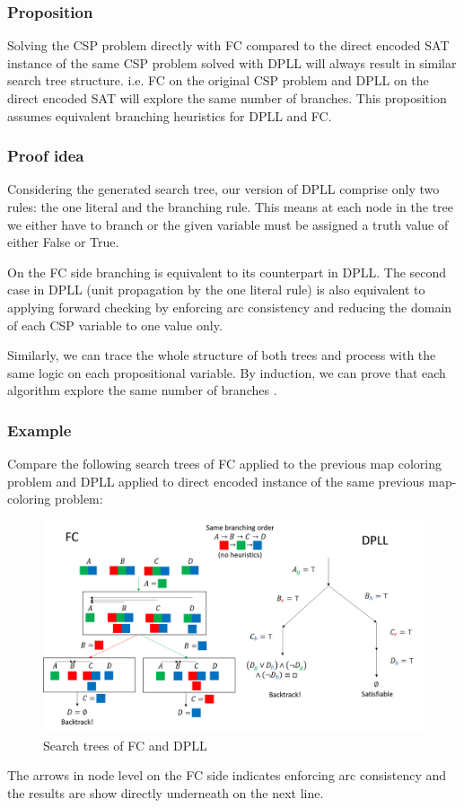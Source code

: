 \subsubsection{Proposition}
Solving the CSP problem directly with FC compared to the direct encoded SAT instance of the same CSP problem solved with DPLL will always result in similar search tree structure. i.e. FC on the original CSP problem and DPLL on the direct encoded SAT will explore the same number of branches. This proposition assumes equivalent branching heuristics for DPLL and FC.

\subsubsection{Proof idea}\label{subsec:direct_encoding_proof}
Considering the generated search tree, our version of DPLL comprise only two rules: the one literal and the branching rule. This means at each node in the tree we either have to branch or the given variable must be assigned a truth value of either False or True. 

On the FC side branching is equivalent to its counterpart in DPLL. The second case in DPLL (unit propagation by the one literal rule) is also equivalent to applying forward checking by enforcing arc consistency and reducing the domain of each CSP variable to one value only.

Similarly, we can trace the whole structure of both trees and process with the same logic on each propositional variable. By induction, we can prove that each algorithm explore the same number of branches \cite{walsh2000sat}. 

\subsubsection{Example}
Compare the following search trees of FC applied to the previous map coloring problem and DPLL applied to direct encoded instance of the same previous map-coloring problem:
\begin{figure}[H]
	\centering
	\includegraphics[width=1\linewidth]{assets/direct_fc_vs_dpll}
	\captionsetup{justification=centering,margin=2cm}
	\caption{Search trees of FC and DPLL}
	\label{fig:direct_fc_vs_dpll}
\end{figure} 
The arrows in node level on the FC side indicates enforcing arc consistency and the results are show directly underneath on the next line.



